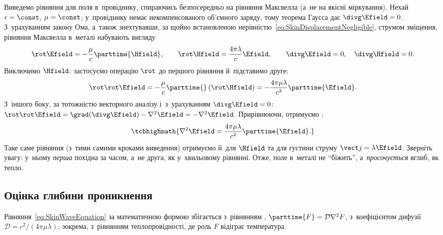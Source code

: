 Виведемо рівняння для поля в~провіднику, спираючись безпосередньо на рівняння Максвелла (а~не на якісні міркування). Нехай $\epsilon=\const$, $\mu=\const$; у~провіднику
немає некомпенсованого об'ємного заряду, тому теорема Гаусса дає $\divg\Efield=0$.
З~урахуванням закону Ома, а~також знехтувавши, за щойно встановленою
нерівністю~\eqref{eq:SkinDisplacementNegligible}, струмом зміщення, рівняння Максвелла
в~металі набувають вигляду
\begin{equation*}
	\rot\Efield = -\frac{\mu}c\parttime{\Hfield}, \qquad \rot\Hfield = \frac{4\pi\lambda}{c}\Efield, \qquad \divg\Efield=0, \quad \divg\Hfield=0.
\end{equation*}
Виключимо $\Hfield$: застосуємо операцію $\rot$ до першого рівняння й~підставимо друге:
\begin{equation*}
	\rot\rot\Efield = -\frac{\mu}c\parttime{}\left(\rot\Hfield\right) = -\frac{4\pi\mu\lambda}{c^2}\parttime{\Efield}.
\end{equation*}
З~іншого боку, за тотожністю векторного аналізу і~з~урахуванням $\divg\Efield=0$:
$\rot\rot\Efield = \grad(\divg\Efield)-\nabla^2\Efield = -\nabla^2\Efield$. Прирівнюючи,
отримуємо :
\begin{equation}\label{eq:SkinWaveEquation}
	\tcbhighmath{
		\nabla^2\Efield = \frac{4\pi\mu\lambda}{c^2}\parttime{\Efield}.
	}
\end{equation}
Таке саме рівняння (з~тими самими кроками виведення) отримуємо й~для $\Hfield$ та для густини струму $\vect j=\lambda\Efield$. Зверніть увагу: у~ньому \emph{перша} похідна за часом, а~не друга, як у~хвильовому рівнянні. Отже, поле в~металі не \enquote{біжить}, а~\emph{просочується} вглиб, як тепло.


\subsection*{Оцінка глибини проникнення}


Рівняння~\eqref{eq:SkinWaveEquation} за математичною формою збігається з~рівнянням
, $\parttime{F} = \mathcal{D}\nabla^2 F$, з~коефіцієнтом дифузії $\mathcal{D} =
c^2/(4\pi\mu\lambda)$; зокрема, з~рівнянням теплопровідності, де роль $F$ відіграє температура.


